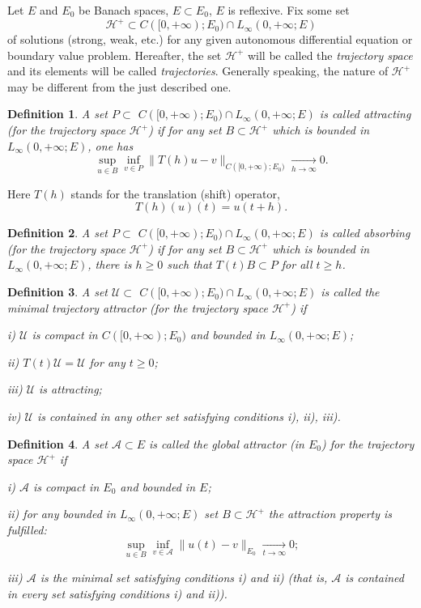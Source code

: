 \documentclass[10pt]{amsart}
\newtheorem{preremark2}{Definition}[section]
\newenvironment{defn}
  {\begin{preremark2}\rm}{\end{preremark2}}
\begin{document}
Let $E $ and $E_0 $ be Banach spaces, $E\subset E_0 $, $E $ is reflexive.
Fix some set
$$\mathcal {H} ^ + \subset C ([0, + \infty); E_0) \cap L_\infty (0, + \infty; E) $$
of solutions (strong, weak, etc.) for any given autonomous differential equation or boundary value problem. Hereafter, the set $ \mathcal {H} ^ + $ will be
called the \textit{trajectory space} and its elements will be
called  \textit{trajectories}. Generally speaking, the nature of $ \mathcal {H} ^ + $ may be
different from the just described one.

\begin{defn} A set $P\subset $ $C ([0, + \infty ); E_0) \cap L_\infty (0,
+ \infty; E) $ is called \textit{attracting} (for the trajectory
space $ \mathcal {H} ^ + $) if for any set $B\subset \mathcal {H} ^ + $ which is bounded in $ L_\infty (0, +
\infty; E) $, one has
$$\sup\limits _ {u\in B} ^ {} \inf\limits _ {v\in P} ^ {} \|T (h) u-v \| _{C ([0, +\infty);E_0)} \underset {h\to\infty} {\to} 0. $$
\end{defn}
Here $T(h)$ stands for the translation (shift) operator,
$$ T (h) (u) (t) =u (t+h). $$ 

\begin{defn} 
 A set $P\subset $ $C ([0, + \infty ); E_0) \cap L_\infty (0, +
\infty; E) $ is called \textit{absorbing} (for the trajectory space
$ \mathcal {H} ^ + $) if for any set $B\subset \mathcal {H} ^ + $ which is bounded in $ L_\infty (0, +
\infty; E) $,  there is $h \geq 0 $
such that $ T (t) B\subset P$ for all $t \geq h $.
\end{defn}

\begin{defn} A set $ \mathcal {U}\subset $ $C ([0, + \infty ); E_0) \cap L_\infty (0,
+ \infty; E) $ is called the \textit{minimal trajectory attractor} (for
the trajectory space $ \mathcal {H} ^ + $) if

i) $ \mathcal {U} $ is compact in $C ([0, + \infty); E_0) $ and bounded in
$L_\infty (0, + \infty; E) $;

ii) $T (t) \mathcal {U}=  \mathcal {U}$ for any $t \geq 0 $;

iii) $ \mathcal {U} $ is attracting;

iv) $ \mathcal {U} $ is contained in any other set satisfying conditions i), ii), iii).
\end{defn}

\begin{defn} A set $ \mathcal {A} \subset E $ is called the \textit{global
attractor} (in $E_0 $) for the trajectory space $ \mathcal {H}
^ + $ if

i) $ \mathcal {A} $ is compact in $E_0 $ and bounded in $E $;

ii) for any bounded in $ L_\infty (0, + \infty; E) $ set $B\subset
\mathcal {H} ^ + $ the attraction property is fulfilled:
$$\sup\limits _ {u\in B} ^ {} \inf\limits _ {v\in \mathcal {A}} ^ {} \|u (t)-v \| _ {E_0} \underset {t\to\infty} {\to} 0; $$

iii) $ \mathcal {A} $ is the minimal set satisfying conditions i)
and ii) (that is, $ \mathcal {A} $ is contained in every set
satisfying conditions i) and ii)). \end{defn}
\end{document}
